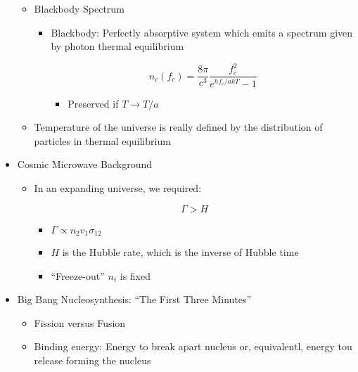 \begin{itemize}
\begin{itemize}
\begin{itemize}
        \end{itemize}

      \item Blackbody Spectrum

        \begin{itemize}

          \item Blackbody: Perfectly absorptive system which emits a spectrum given by photon thermal equilibrium

            $$n_c(f_c)=\frac{8\pi}{c^3}\frac{f_c^2}{e^{hf_c/akT}-1}$$

            \begin{itemize}

              \item Preserved if $T\to T/a$

            \end{itemize}

        \end{itemize}

      \item Temperature of the universe is really defined by the distribution of particles in thermal equilibrium

    \end{itemize}

  \item Cosmic Microwave Background

    \begin{itemize}
        
      \item In an expanding universe, we required:

        $$\Gamma>H$$

        \begin{itemize}

          \item $\Gamma\propto n_2v_1\sigma_{12}$

          \item $H$ is the Hubble rate, which is the inverse of Hubble time

          \item ``Freeze-out'' $n_i$ is fixed

        \end{itemize}

    \end{itemize}

  \item Big Bang Nucleosynthesis: ``The First Three Minutes''

    \begin{itemize}

      \item Fission versus Fusion

      \item Binding energy: Energy to break apart nucleus or, equivalentl, energy tou release forming the nucleus

    \end{itemize}

\end{itemize}



